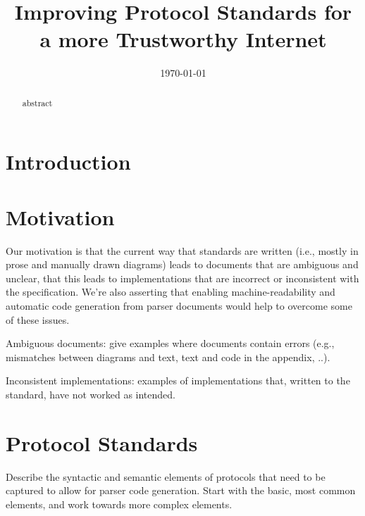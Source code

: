 \documentclass[10pt,twocolumn,a4paper]{article}
\begin{document}
\title{Improving Protocol Standards for a more Trustworthy Internet}
\author{}
\date{\today}
\maketitle
\begin{abstract}

abstract

\end{abstract}

\section{Introduction}

\section{Motivation}
\label{sec:motivation}

Our motivation is that the current way that standards are written (i.e.,
mostly in prose and manually drawn diagrams) leads to documents that are
ambiguous and unclear, that this leads to implementations that are incorrect
or inconsistent with the specification. We're also asserting that enabling
machine-readability and automatic code generation from parser documents would
help to overcome some of these issues.

Ambiguous documents: give examples where documents contain errors (e.g.,
mismatches between diagrams and text, text and code in the appendix, ..).

Inconsistent implementations: examples of implementations that, written to the
standard, have not worked as intended.

\section{Protocol Standards}
\label{sec:standards}

Describe the syntactic and semantic elements of protocols that need to be
captured to allow for parser code generation. Start with the basic, most
common elements, and work towards more complex elements.
\end{document}
